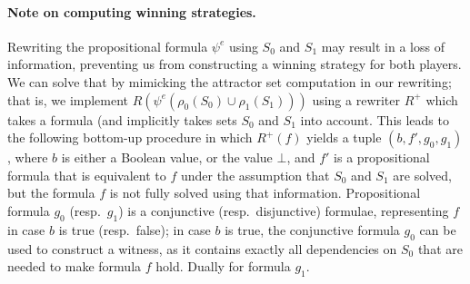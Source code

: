 \documentclass{article}
\begin{document}
\paragraph{Note on computing winning strategies.} Rewriting the propositional formula
$\psi^e$ using $S_0$ and $S_1$ may result in a loss of information, preventing us from
constructing a winning strategy for both players. We can solve that by mimicking the
attractor set computation in our rewriting; that is, we implement $R(\psi^e(\rho_0(S_0) \cup \rho_1(S_1)))$
using a rewriter $R^+$ which takes a formula (and implicitly takes sets $S_0$ and $S_1$ into account. 
This leads to the following bottom-up
procedure in which $R^+(f)$ yields a tuple $(b, f',g_0,g_1)$, where $b$ is either a Boolean value,
or the value $\bot$, and $f'$ is a propositional formula that is equivalent to $f$ under
the assumption that $S_0$ and $S_1$ are solved, but the formula $f$ is not fully solved using that information. Propositional formula $g_0$ (resp.\ $g_1$) is a conjunctive (resp.\ disjunctive) formulae, representing $f$ in case $b$ is true (resp.\ false); in case $b$ is true, the conjunctive formula $g_0$ can be used to construct a witness, as it contains exactly all dependencies on $S_0$ that are needed to make formula $f$ hold. Dually for formula $g_1$.
\end{document}
